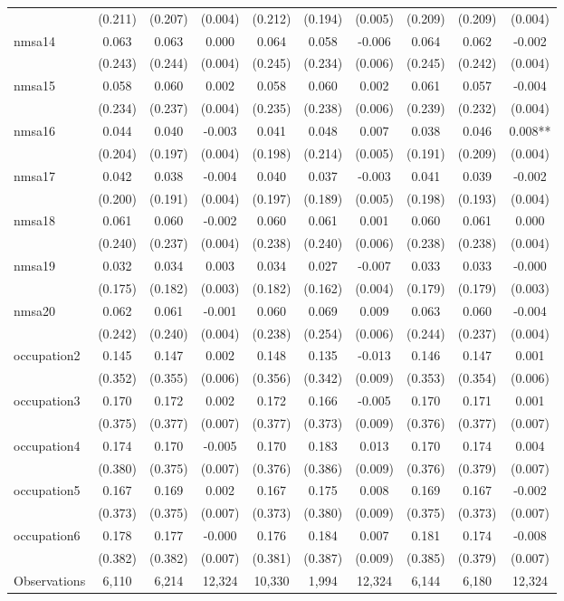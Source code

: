 \begin{tabular}{l*{9}c}
&(0.211)&(0.207)&(0.004)&(0.212)&(0.194)&(0.005)&(0.209)&(0.209)&(0.004)\\
nmsa14&0.063&0.063&0.000&0.064&0.058&-0.006&0.064&0.062&-0.002\\
&(0.243)&(0.244)&(0.004)&(0.245)&(0.234)&(0.006)&(0.245)&(0.242)&(0.004)\\
nmsa15&0.058&0.060&0.002&0.058&0.060&0.002&0.061&0.057&-0.004\\
&(0.234)&(0.237)&(0.004)&(0.235)&(0.238)&(0.006)&(0.239)&(0.232)&(0.004)\\
nmsa16&0.044&0.040&-0.003&0.041&0.048&0.007&0.038&0.046&0.008**\\
&(0.204)&(0.197)&(0.004)&(0.198)&(0.214)&(0.005)&(0.191)&(0.209)&(0.004)\\
nmsa17&0.042&0.038&-0.004&0.040&0.037&-0.003&0.041&0.039&-0.002\\
&(0.200)&(0.191)&(0.004)&(0.197)&(0.189)&(0.005)&(0.198)&(0.193)&(0.004)\\
nmsa18&0.061&0.060&-0.002&0.060&0.061&0.001&0.060&0.061&0.000\\
&(0.240)&(0.237)&(0.004)&(0.238)&(0.240)&(0.006)&(0.238)&(0.238)&(0.004)\\
nmsa19&0.032&0.034&0.003&0.034&0.027&-0.007&0.033&0.033&-0.000\\
&(0.175)&(0.182)&(0.003)&(0.182)&(0.162)&(0.004)&(0.179)&(0.179)&(0.003)\\
nmsa20&0.062&0.061&-0.001&0.060&0.069&0.009&0.063&0.060&-0.004\\
&(0.242)&(0.240)&(0.004)&(0.238)&(0.254)&(0.006)&(0.244)&(0.237)&(0.004)\\
occupation2&0.145&0.147&0.002&0.148&0.135&-0.013&0.146&0.147&0.001\\
&(0.352)&(0.355)&(0.006)&(0.356)&(0.342)&(0.009)&(0.353)&(0.354)&(0.006)\\
occupation3&0.170&0.172&0.002&0.172&0.166&-0.005&0.170&0.171&0.001\\
&(0.375)&(0.377)&(0.007)&(0.377)&(0.373)&(0.009)&(0.376)&(0.377)&(0.007)\\
occupation4&0.174&0.170&-0.005&0.170&0.183&0.013&0.170&0.174&0.004\\
&(0.380)&(0.375)&(0.007)&(0.376)&(0.386)&(0.009)&(0.376)&(0.379)&(0.007)\\
occupation5&0.167&0.169&0.002&0.167&0.175&0.008&0.169&0.167&-0.002\\
&(0.373)&(0.375)&(0.007)&(0.373)&(0.380)&(0.009)&(0.375)&(0.373)&(0.007)\\
occupation6&0.178&0.177&-0.000&0.176&0.184&0.007&0.181&0.174&-0.008\\
&(0.382)&(0.382)&(0.007)&(0.381)&(0.387)&(0.009)&(0.385)&(0.379)&(0.007)\\
\hline
Observations & 6,110 & 6,214 & 12,324 & 10,330 & 1,994 & 12,324 & 6,144 & 6,180 & 12,324 \\
\hline\hline
\end{tabular}
